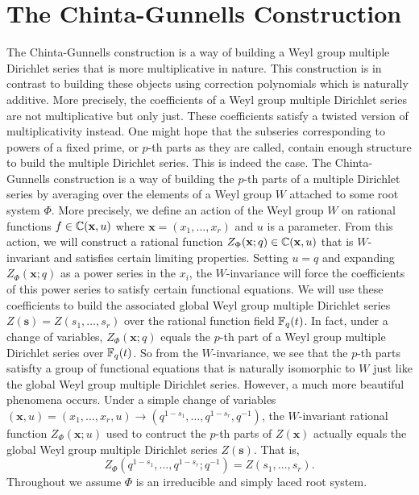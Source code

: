 \section{The Chinta-Gunnells Construction}
    The Chinta-Gunnells construction is a way of building a Weyl group multiple Dirichlet series that is more multiplicative in nature. This construction is in contrast to building these objects using correction polynomials which is naturally additive. More precisely, the coefficients of a Weyl group multiple Dirichlet series are not multiplicative but only just. These coefficients satisfy a twisted version of multiplicativity instead. One might hope that the subseries corresponding to powers of a fixed prime, or $p$-th parts as they are called, contain enough structure to build the multiple Dirichlet series. This is indeed the case. The Chinta-Gunnells construction is a way of building the $p$-th parts of a multiple Dirichlet series by averaging over the elements of a Weyl group $W$ attached to some root system $\Phi$. More precisely, we define an action of the Weyl group $W$ on rational functions $f \in \mathbb{C}(\mathbf{x},u)$ where $\mathbf{x} = (x_{1},\ldots,x_{r})$ and $u$ is a parameter. From this action, we will construct a rational function $Z_{\Phi}(\mathbf{x};q) \in \mathbb{C}(\mathbf{x},u)$ that is $W$-invariant and satisfies certain limiting properties. Setting $u = q$ and expanding $Z_{\Phi}(\mathbf{x};q)$ as a power series in the $x_{i}$, the $W$-invariance will force the coefficients of this power series to satisfy certain functional equations. We will use these coefficients to build the associated global Weyl group multiple Dirichlet series $Z(\mathbf{s}) = Z(s_{1},\ldots,s_{r})$ over the rational function field $\mathbb{F}_{q}(t)$. In fact, under a change of variables, $Z_{\Phi}(\mathbf{x};q)$ equals the $p$-th part of a Weyl group multiple Dirichlet series over $\mathbb{F}_{q}(t)$. So from the $W$-invariance, we see that the $p$-th parts satisfty a group of functional equations that is naturally isomorphic to $W$ just like the global Weyl group multiple Dirichlet series. However, a much more beautiful phenomena occurs. Under a simple change of variables $(\mathbf{x},u) = (x_{1},\ldots,x_{r},u) \to (q^{1-s_{1}},\ldots,q^{1-s_{r}},q^{-1})$, the $W$-invariant rational function $Z_{\Phi}(\mathbf{x};u)$ used to contruct the $p$-th parts of $Z(\mathbf{x})$ actually equals the global Weyl group multiple Dirichlet series $Z(\mathbf{s})$. That is,
    \[
        Z_{\Phi}(q^{1-s_{1}},\ldots,q^{1-s_{r}};q^{-1}) = Z(s_{1},\ldots,s_{r}).
    \]
    Throughout we assume $\Phi$ is an irreducible and simply laced root system.
